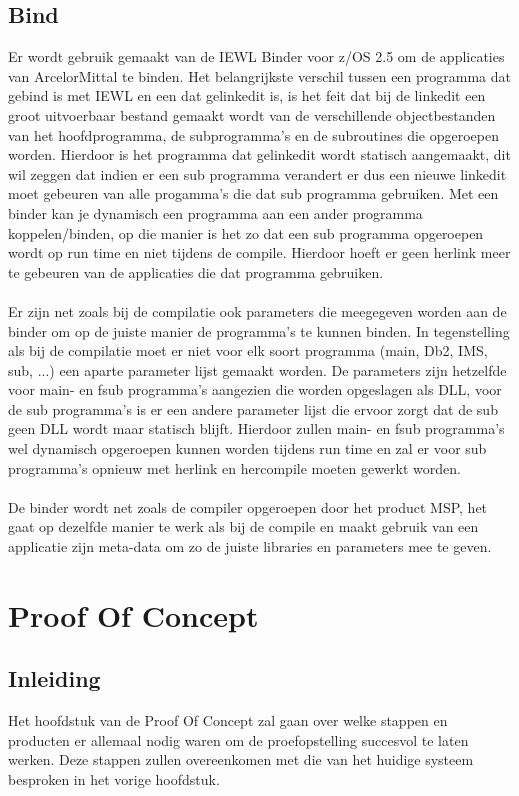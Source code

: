 \section{Bind}
\label{sec:bind}
Er wordt gebruik gemaakt van de IEWL Binder voor z/OS 2.5 om de applicaties van ArcelorMittal te binden. Het belangrijkste verschil tussen een programma dat gebind is met IEWL en een dat gelinkedit is, is het feit dat bij de linkedit een groot uitvoerbaar bestand gemaakt wordt van de verschillende objectbestanden van het hoofdprogramma, de subprogramma's en de subroutines die opgeroepen worden. Hierdoor is het programma dat gelinkedit wordt statisch aangemaakt, dit wil zeggen dat indien er een sub programma verandert er dus een nieuwe linkedit moet gebeuren van alle progamma's die dat sub programma gebruiken. Met een binder kan je dynamisch een programma aan een ander programma koppelen/binden, op die manier is het zo dat een sub programma opgeroepen wordt op run time en niet tijdens de compile. Hierdoor hoeft er geen herlink meer te gebeuren van de applicaties die dat programma gebruiken. 
\\ \\
Er zijn net zoals bij de compilatie ook parameters die meegegeven worden aan de binder om op de juiste manier de programma's te kunnen binden. In tegenstelling als bij de compilatie moet er niet voor elk soort programma (main, Db2, IMS, sub, ...) een aparte parameter lijst gemaakt worden. De parameters zijn hetzelfde voor main- en fsub programma's aangezien die worden opgeslagen als DLL, voor de sub programma's is er een andere parameter lijst die ervoor zorgt dat de sub geen DLL wordt maar statisch blijft. Hierdoor zullen main- en fsub programma's wel dynamisch opgeroepen kunnen worden tijdens run time en zal er voor sub programma's opnieuw met herlink en hercompile moeten gewerkt worden. 
\\ \\ 
De binder wordt net zoals de compiler opgeroepen door het product MSP, het gaat op dezelfde manier te werk als bij de compile en maakt gebruik van een applicatie zijn meta-data om zo de juiste libraries en parameters mee te geven.

\chapter{Proof Of Concept}
\label{ch:poc}

\section{Inleiding}
\label{sec:inleiding_poc}
Het hoofdstuk van de Proof Of Concept zal gaan over welke stappen en producten er allemaal nodig waren om de proefopstelling succesvol te laten werken. Deze stappen zullen overeenkomen met die van het huidige systeem besproken in het vorige hoofdstuk.
\\ \\


